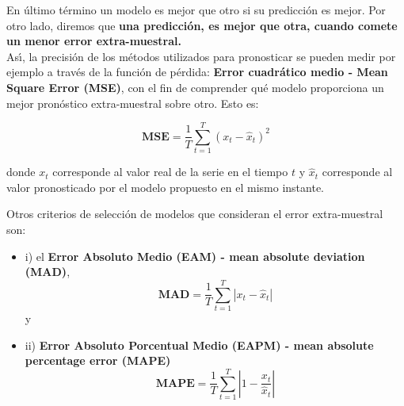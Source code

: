 \pagebreak En \'ultimo t\'ermino un modelo es mejor que otro si su predicci\'on es mejor. Por otro lado, diremos que \textbf{una predicci\'on, es mejor que otra, cuando comete un menor error extra-muestral.}\\
As\'{\i}, la precisi\'on de los m\'etodos utilizados para pronosticar se pueden medir por ejemplo a trav\'es de la funci\'on de p\'erdida: \textbf{Error cuadr\'atico medio - Mean Square Error (MSE)}, con el fin de comprender qu\'e modelo proporciona un mejor pron\'ostico extra-muestral sobre otro. Esto es:

\begin{equation}
\textbf{MSE}=\frac{1}{T} \sum_{t=1}^T (x_t-\hat{x}_t)^2
\label{MSE}
\end{equation}

donde $x_t$ corresponde al valor real de la serie en el tiempo $t$ y $\hat{x}_{t}$ corresponde al valor pronosticado por el modelo propuesto en el mismo instante.



Otros criterios de selecci\'on de modelos que consideran el error extra-muestral son: 
\begin{itemize}
	\item i) el \textbf{Error Absoluto Medio (EAM) - mean absolute deviation (MAD)},
	\begin{equation}
	\textbf{MAD}=\frac{1}{T} \sum_{t=1}^T |x_t-\hat{x}_t|
	\label{MAD}
	\end{equation} y 
	\item ii) \textbf{Error Absoluto Porcentual Medio (EAPM) - mean absolute percentage error (MAPE)}
	\begin{equation}
	\textbf{MAPE}=\frac{1}{T} \sum_{t=1}^T \left| 1 - \frac{x_t}{\hat{x}_t}\right|
	\label{MAPE}
	\end{equation}
	 
\end{itemize}



